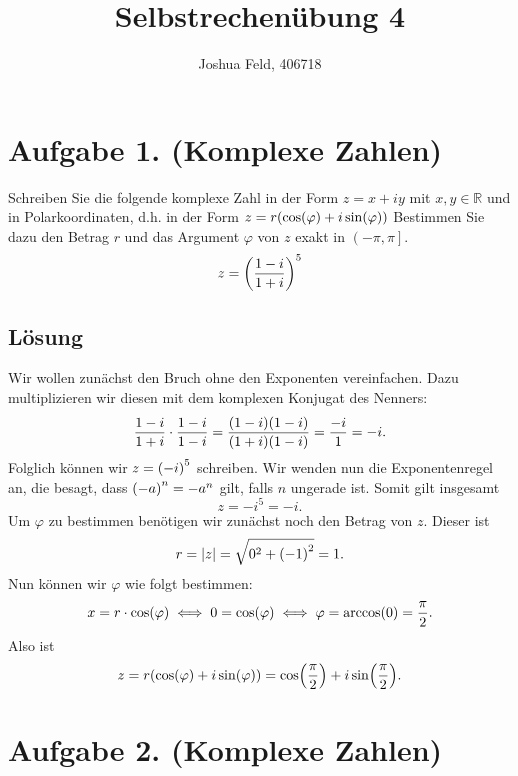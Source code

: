 \documentclass[german,12pt]{homework}
\title{Selbstrechenübung 4}
\author{Joshua Feld, 406718}
\institute{RWTH Aachen University\\Center for Computational Engineering Science}
\DeclarePairedDelimiter{\absolute}{\lvert}{\rvert}
\DeclarePairedDelimiter{\enbrace}{(}{)}
\begin{document}
    \maketitle

    \section*{Aufgabe 1. (Komplexe Zahlen)}

    \begin{problem}
        Schreiben Sie die folgende komplexe Zahl in der Form \(z = x + iy\) mit
        \(x, y \in \mathbb{R}\) und in Polarkoordinaten, d.h. in der Form \(z =
        r\enbrace*{\cos\enbrace*{\varphi} + i\sin\enbrace*{\varphi}}\)
        Bestimmen Sie dazu den Betrag \(r\) und das Argument \(\varphi\) von
        \(z\) exakt in \(\left(-\pi, \pi\right]\).
        \[z = \enbrace*{\frac{1 - i}{1 + i}}^5\]
    \end{problem}

    \subsection*{Lösung} Wir wollen zunächst den Bruch ohne den Exponenten
    vereinfachen. Dazu multiplizieren wir diesen mit dem komplexen Konjugat des
    Nenners:
    \[\frac{1 - i}{1 + i} \cdot \frac{1 - i}{1 - i} = \frac{\enbrace*{1 -
    i}\enbrace*{1 - i}}{\enbrace*{1 + i}\enbrace*{1 - i}} = \frac{-i}{1} = -i.\]
    Folglich können wir \(z = \enbrace*{-i}^5\) schreiben. Wir wenden nun die
    Exponentenregel an, die besagt, dass \(\enbrace*{-a}^n = -a^n\) gilt, falls
    \(n\) ungerade ist. Somit gilt insgesamt
    \[z = -i^5 = -i.\]
    Um \(\varphi\) zu bestimmen benötigen wir zunächst noch den Betrag von
    \(z\). Dieser ist
    \[r = \absolute*{z} = \sqrt{0^2 + \enbrace*{-1}^2} = 1.\]
    Nun können wir \(\varphi\) wie folgt bestimmen:
    \[x = r \cdot \cos\enbrace*{\varphi} \iff 0 = \cos\enbrace*{\varphi} \iff
    \varphi = \arccos\enbrace*{0} = \frac{\pi}{2}.\]
    Also ist
    \[z = r\enbrace*{\cos\enbrace*{\varphi} + i\sin\enbrace*{\varphi}} =
    \cos\enbrace*{\frac{\pi}{2}} + i\sin\enbrace*{\frac{\pi}{2}}.\]

    \section*{Aufgabe 2. (Komplexe Zahlen)}
\end{document}

